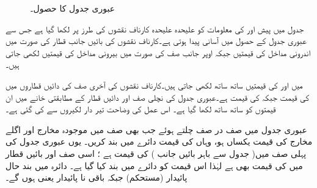 \begin{figure}
\caption{عبوری جدول کا حصول۔}
\label{شکل_غیر_معاصر_عبوری_جدول_حصول}
\end{figure}


جدول  میں پیش   اور  کی معلومات کو علیحدہ علیحدہ کارناف نقشوں کی طرز پر لکھا گیا ہے جس سے عبوری جدول کے حصول میں آسانی پیدا ہوتی ہے۔کارناف نقشوں کی بائیں جانب قطار کی صورت میں اندرونی مداخل  کی قیمتیں جبکہ اوپر جانب صف کی صورت میں بیرونی مداخل  کی قیمتیں لکھی جاتی ہیں۔

 میں  اور  کی قیمتیں ساتھ ساتھ  لکھی جاتی ہیں۔کارناف نقشوں کی آخری صف  کی دائیں قطاروں میں  کی قیمت  جبکہ  کی قیمت  ہے۔عبوری جدول کی نچلی صف اور دائیں قطار کے مطابقتی  خانے میں ان قیمتوں کو ساتھ ساتھ  لکھا گیا ہے۔ اس عمل کی وضاحت  تیر دار  لکیروں سے کی گئی ہے۔

عبوری جدول میں صف در صف چلتے ہوئے جب بھی صف میں موجودہ مخارج  اور اگلے مخارج  کی قیمت یکساں ہو، وہاں   کی قیمت دائرے میں بند کریں۔ یوں عبوری جدول کی پہلی صف میں(  جدول سے باہر بائیں  جانب )  کی قیمت  ہے  ؛ اسی صف  اور  بائیں قطار میں  کی قیمت بھی  ہے لہٰذا اس قیمت کو دائرے میں  بند کیا  گیا ہے۔ دائرہ میں بند حال پائیدار (مستحکم) جبکہ باقی نا پائیدار یعنی   ہوں گے۔ 

